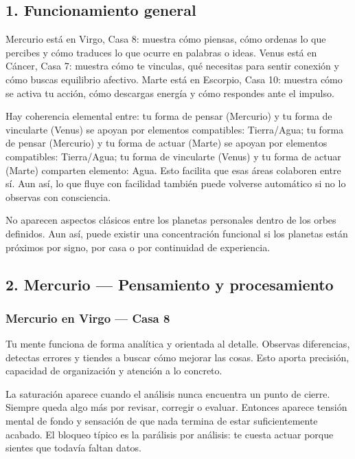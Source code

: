 \documentclass[11pt,a4paper]{article}
\begin{document}
\subsection{1. Funcionamiento general}

\justifying
Mercurio está en Virgo, Casa 8: muestra cómo piensas, cómo ordenas lo que percibes y cómo traduces lo que ocurre en palabras o ideas.
Venus está en Cáncer, Casa 7: muestra cómo te vinculas, qué necesitas para sentir conexión y cómo buscas equilibrio afectivo.
Marte está en Escorpio, Casa 10: muestra cómo se activa tu acción, cómo descargas energía y cómo respondes ante el impulso.

Hay coherencia elemental entre: tu forma de pensar (Mercurio) y tu forma de vincularte (Venus) se apoyan por elementos compatibles: Tierra/Agua; tu forma de pensar (Mercurio) y tu forma de actuar (Marte) se apoyan por elementos compatibles: Tierra/Agua; tu forma de vincularte (Venus) y tu forma de actuar (Marte) comparten elemento: Agua. Esto facilita que esas áreas colaboren entre sí. Aun así, lo que fluye con facilidad también puede volverse automático si no lo observas con consciencia.

No aparecen aspectos clásicos entre los planetas personales dentro de los orbes definidos. Aun así, puede existir una concentración funcional si los planetas están próximos por signo, por casa o por continuidad de experiencia.

\vspace{0.8cm}

\subsection{2. Mercurio — Pensamiento y procesamiento}

\subsubsection*{Mercurio en Virgo — Casa 8}

\justifying
Tu mente funciona de forma analítica y orientada al detalle. Observas diferencias, detectas errores y tiendes a buscar cómo mejorar las cosas. Esto aporta precisión, capacidad de organización y atención a lo concreto.

La saturación aparece cuando el análisis nunca encuentra un punto de cierre. Siempre queda algo más por revisar, corregir o evaluar. Entonces aparece tensión mental de fondo y sensación de que nada termina de estar suficientemente acabado. El bloqueo típico es la parálisis por análisis: te cuesta actuar porque sientes que todavía faltan datos.
\end{document}
